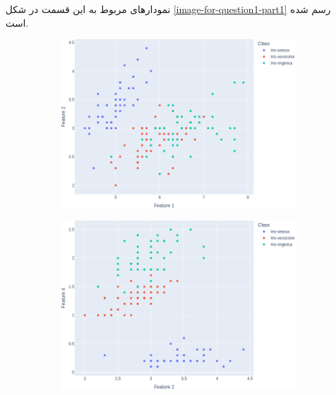 \documentclass[14pt,a4]{article}
\begin{document}
نمودار‌های مربوط به این قسمت در شکل \ref{image-for-question1-part1} رسم شده است.

\begin{figure}[h]
    \centering
    \begin{subfigure}{0.32\linewidth}
        \centering
        \includegraphics[width=\linewidth]{images/q3/p1/12.png}
    \end{subfigure}
    \hfill
    \begin{subfigure}{0.32\linewidth}
        \centering
        \includegraphics[width=\linewidth]{images/q3/p1/24.png}
    \end{subfigure}
    \hfill
    \begin{subfigure}{0.32\linewidth}
        \centering

\end{subfigure}
\end{figure}
\end{document}
